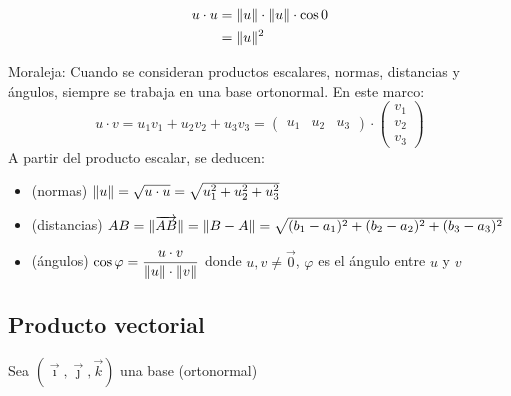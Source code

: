\documentclass[11pt,a4paper]{article}
\begin{document}
\begin{demo}[Demostración de (2)]
\begin{align*}
u\cdot u&=\lVert u\rVert\cdot\lVert u\rVert\cdot\cos0\\
&=\lVert u\rVert^2
\end{align*}
\end{demo}

Moraleja: Cuando se consideran productos escalares, normas, distancias y ángulos, siempre se trabaja en una base ortonormal. En este marco:
\[
u\cdot v=u_1v_1+u_2v_2+u_3v_3=\begin{pmatrix}u_1&u_2&u_3\end{pmatrix}\cdot\begin{pmatrix}v_1\\v_2\\v_3\end{pmatrix}
\]
A partir del producto escalar, se deducen:
\begin{itemize}
  \item[] (normas) \quad $\lVert u\rVert=\sqrt{u\cdot u}=\sqrt{u_1^2+u_2^2+u_3^2}$
  \item[] (distancias) \quad $AB=\lVert\overrightarrow{AB}\rVert=\lVert B-A\rVert=\sqrt{(b_1-a_1)^2+(b_2-a_2)^2+(b_3-a_3)^2}$
  \item[] (ángulos) \quad $\cos\varphi=\dfrac{u\cdot v}{\lVert u\rVert\cdot\lVert v\rVert}$ \quad donde $u,v\neq\vec0$, $\varphi$ es el ángulo entre $u$ y $v$
\end{itemize}

\subsection{Producto vectorial}

\begin{definicion}
Sea $(\vec\imath,\vec\jmath,\vec k)$ una base (ortonormal)
\begin{center}
\end{center}
\end{definicion}
\end{document}
